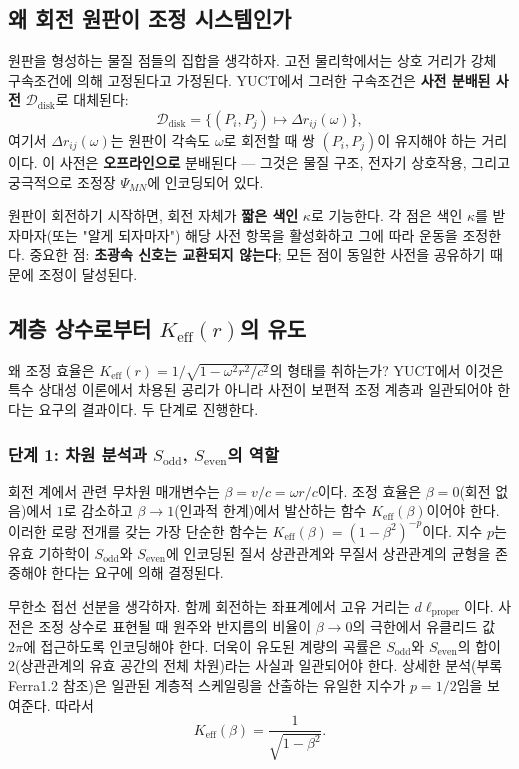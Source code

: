 \documentclass[12pt,a4paper]{article}
\newcommand{\Sodd}{S_{\mathrm{odd}}}
\newcommand{\Seven}{S_{\mathrm{even}}}
\begin{document}
	\subsection{왜 회전 원판이 조정 시스템인가}
	\label{subsec:disk-coordination}
	
	원판을 형성하는 물질 점들의 집합을 생각하자. 고전 물리학에서는 상호 거리가 강체 구속조건에 의해 고정된다고 가정된다. YUCT에서 그러한 구속조건은 \textbf{사전 분배된 사전} \(\mathcal{D}_{\text{disk}}\)로 대체된다:
	\[
	\mathcal{D}_{\text{disk}} = \bigl\{ (P_i, P_j) \mapsto \Delta r_{ij}(\omega) \bigr\},
	\]
	여기서 \(\Delta r_{ij}(\omega)\)는 원판이 각속도 \(\omega\)로 회전할 때 쌍 \((P_i,P_j)\)이 유지해야 하는 거리이다. 이 사전은 \textbf{오프라인으로} 분배된다 — 그것은 물질 구조, 전자기 상호작용, 그리고 궁극적으로 조정장 \(\Psi_{MN}\)에 인코딩되어 있다.
	
	원판이 회전하기 시작하면, 회전 자체가 \textbf{짧은 색인} \(\kappa\)로 기능한다. 각 점은 색인 \(\kappa\)를 받자마자(또는 "알게 되자마자") 해당 사전 항목을 활성화하고 그에 따라 운동을 조정한다. 중요한 점: \textbf{초광속 신호는 교환되지 않는다}; 모든 점이 동일한 사전을 공유하기 때문에 조정이 달성된다.
	
	\subsection{계층 상수로부터 \(K_{\mathrm{eff}}(r)\)의 유도}
	\label{subsec:keff-derivation}
	
	왜 조정 효율은 \(K_{\mathrm{eff}}(r) = 1/\sqrt{1-\omega^2 r^2/c^2}\)의 형태를 취하는가? YUCT에서 이것은 특수 상대성 이론에서 차용된 공리가 아니라 사전이 보편적 조정 계층과 일관되어야 한다는 요구의 결과이다. 두 단계로 진행한다.
	
	\subsubsection{단계 1: 차원 분석과 \(\Sodd\), \(\Seven\)의 역할}
	회전 계에서 관련 무차원 매개변수는 \(\beta = v/c = \omega r/c\)이다. 조정 효율은 \(\beta = 0\)(회전 없음)에서 \(1\)로 감소하고 \(\beta \to 1\)(인과적 한계)에서 발산하는 함수 \(K_{\mathrm{eff}}(\beta)\)이어야 한다. 이러한 로랑 전개를 갖는 가장 단순한 함수는 \(K_{\mathrm{eff}}(\beta) = (1-\beta^2)^{-p}\)이다. 지수 \(p\)는 유효 기하학이 \(\Sodd\)와 \(\Seven\)에 인코딩된 질서 상관관계와 무질서 상관관계의 균형을 존중해야 한다는 요구에 의해 결정된다.
	
	무한소 접선 선분을 생각하자. 함께 회전하는 좌표계에서 고유 거리는 \(d\ell_{\text{proper}}\)이다. 사전은 조정 상수로 표현될 때 원주와 반지름의 비율이 \(\beta \to 0\)의 극한에서 유클리드 값 \(2\pi\)에 접근하도록 인코딩해야 한다. 더욱이 유도된 계량의 곡률은 \(\Sodd\)와 \(\Seven\)의 합이 \(2\)(상관관계의 유효 공간의 전체 차원)라는 사실과 일관되어야 한다. 상세한 분석(부록 Ferra1.2 참조)은 일관된 계층적 스케일링을 산출하는 유일한 지수가 \(p = 1/2\)임을 보여준다. 따라서
	\[
	K_{\mathrm{eff}}(\beta) = \frac{1}{\sqrt{1-\beta^2}}.
	\]
	
\end{document}
